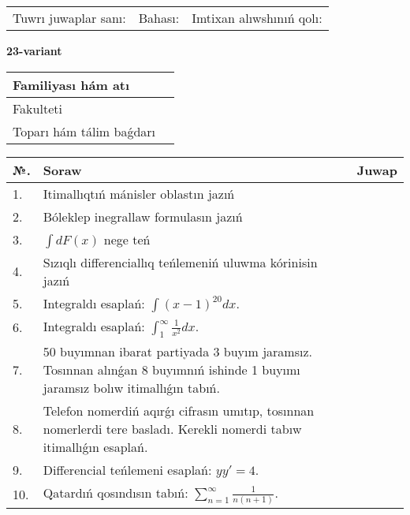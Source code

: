 \documentclass{article}
\begin{document}
\vspace{1cm}

\begin{tabular}{ c c c }
Tuwrı juwaplar sanı: \underline{\hspace{2cm}} & Bahası: \underline{\hspace{2cm}} & Imtixan alıwshınıń qolı: \underline{\hspace{2cm}} \\
\end{tabular}

\newpage

\begin{center}\textbf{23-variant}\end{center}

\bgroup
\def\arraystretch{1.5}
\begin{tabular}{ |m{6cm}|m{10cm}| }
  \hline
  Familiyası hám atı & \\
  \hline
  Fakulteti &\\
  \hline
  Toparı hám tálim baǵdarı & \\
  \hline
\end{tabular}
\egroup

\vspace{0.5cm}

\bgroup
\def\arraystretch{2}
\begin{tabular}{ |l|m{8cm}|m{7cm}| }
  \hline
  №. & Soraw & Juwap \\
  \hline
  1. & Itimallıqtıń mánisler oblastın jazıń &  \\
  \hline
  2. & Bóleklep inegrallaw formulasın jazıń &  \\
  \hline
  3. & $\displaystyle\int dF(x)$ nege teń &  \\
  \hline
  4. & Sızıqlı differenciallıq teńlemeniń uluwma kórinisin jazıń &  \\
  \hline
  5. & Integraldı esaplań: $\displaystyle\int (x - 1)^{20}dx$. &  \\
  \hline
  6. & Integraldı esaplań: $\displaystyle\int_{1}^{\infty}{\frac{1}{x^{2}}dx}$. &  \\
  \hline
  7. & 50 buyımnan ibarat partiyada 3 buyım jaramsız. Tosınnan alınǵan 8 buyımnıń ishinde 1 buyımı jaramsız bolıw itimallıǵın tabıń. &  \\
  \hline
  8. & Telefon nomerdiń aqırǵı cifrasın umıtıp, tosınnan nomerlerdi tere basladı. Kerekli nomerdi tabıw itimallıǵın esaplań. &  \\
  \hline
  9. & Differencial teńlemeni esaplań: $yy'= 4$. &  \\
  \hline
  10. & Qatardıń qosındısın tabıń: $\displaystyle\sum_{n = 1}^{\infty}\frac{1}{n(n + 1)}$. &  \\
  \hline
\end{tabular}
\egroup
\end{document}
